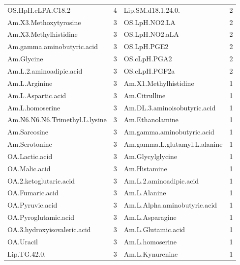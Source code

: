 \documentclass{amsart}
\begin{document}
\begin{table}[H]
\begin{threeparttable}
\begin{tabular}{lclc}
  OS.HpH.cLPA.C18.2              & 4      & Lip.SM.d18.1.24.0.            & 2      \\
  Am.X3.Methoxytyrosine          & 3      & OS.LpH.NO2.LA                 & 2      \\
  Am.X3.Methylhistidine          & 3      & OS.LpH.NO2.aLA                & 2      \\
  Am.gamma.aminobutyric.acid     & 3      & OS.LpH.PGE2                   & 2      \\
  Am.Glycine                     & 3      & OS.cLpH.PGA2                  & 2      \\
  Am.L.2.aminoadipic.acid        & 3      & OS.cLpH.PGF2a                 & 2      \\
  Am.L.Arginine                  & 3      & Am.X1.Methylhistidine         & 1      \\
  Am.L.Aspartic.acid             & 3      & Am.Citrulline                 & 1      \\
  Am.L.homoserine                & 3      & Am.DL.3.aminoisobutyric.acid  & 1      \\
  Am.N6.N6.N6.Trimethyl.L.lysine & 3      & Am.Ethanolamine               & 1      \\
  Am.Sarcosine                   & 3      & Am.gamma.aminobutyric.acid    & 1      \\
  Am.Serotonine                  & 3      & Am.gamma.L.glutamyl.L.alanine & 1      \\
  OA.Lactic.acid                 & 3      & Am.Glycylglycine              & 1      \\
  OA.Malic.acid                  & 3      & Am.Histamine                  & 1      \\
  OA.2.ketoglutaric.acid         & 3      & Am.L.2.aminoadipic.acid       & 1      \\
  OA.Fumaric.acid                & 3      & Am.L.Alanine                  & 1      \\
  OA.Pyruvic.acid                & 3      & Am.L.Alpha.aminobutyric.acid  & 1      \\
  OA.Pyroglutamic.acid           & 3      & Am.L.Asparagine               & 1      \\
  OA.3.hydroxyisovaleric.acid    & 3      & Am.L.Glutamic.acid            & 1      \\
  OA.Uracil                      & 3      & Am.L.homoserine               & 1      \\
  Lip.TG.42.0.                   & 3      & Am.L.Kynurenine               & 1      \\ \bottomrule

\end{tabular}
\end{threeparttable}
\end{table}
\end{document}
